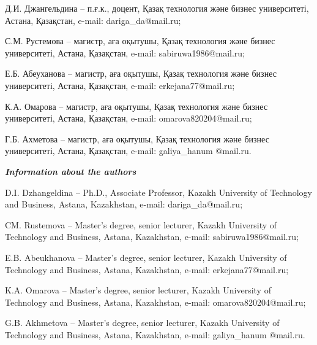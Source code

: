 \begin{noparindent}
Д.И. Джангельдина -- п.ғ.к., доцент, Қазақ технология және бизнес
университеті, Астана, Қазақстан, e-mail: dariga\_da@mail.ru;

С.М. Рустемова -- магистр, аға оқытушы, Қазақ технология және бизнес
университеті, Астана, Қазақстан, e-mail: sabiruwa1986@mail.ru;

Е.Б. Абеуханова -- магистр, аға оқытушы, Қазақ технология және бизнес
университеті, Астана, Қазақстан, e-mail: erkejana77@mail.ru;

К.А. Омарова -- магистр, аға оқытушы, Қазақ технология және бизнес
университеті, Астана, Қазақстан, e-mail: omarova820204@mail.ru;

Г.Б. Ахметова -- магистр, аға оқытушы, Қазақ технология және бизнес
университеті, Астана, Қазақстан, e-mail: galiya\_hanum @mail.ru.
\end{noparindent}

\emph{{\bfseries Information about the authors}}

\begin{noparindent}
D.I. Dzhangeldina -- Ph.D., Associate Professor, Kazakh University of
Technology and Business, Astana, Kazakhstan, e-mail: dariga\_da@mail.ru;

CM. Rustemova -- Master's degree, senior lecturer, Kazakh University of
Technology and Business, Astana, Kazakhstan, e-mail:
sabiruwa1986@mail.ru;

E.B. Abeukhanova -- Master's degree, senior lecturer, Kazakh University
of Technology and Business, Astana, Kazakhstan, e-mail:
erkejana77@mail.ru;

K.A. Omarova -- Master's degree, senior lecturer, Kazakh University of
Technology and Business, Astana, Kazakhstan, e-mail:
omarova820204@mail.ru;

G.B. Akhmetova -- Master's degree, senior lecturer, Kazakh University of
Technology and Business, Astana, Kazakhstan, e-mail: galiya\_hanum
@mail.ru.
\end{noparindent}
